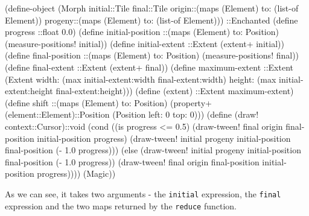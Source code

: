 \documentclass[acmsmall]{acmart}
\newenvironment{Snippet}{\Verbatim[samepage=true]}{\endVerbatim}
\begin{document}
\begin{Snippet}
(define-object (Morph initial::Tile final::Tile
		      origin::(maps (Element) to: (list-of Element))
		      progeny::(maps (Element) to: (list-of Element)))
  ::Enchanted
\end{Snippet}
\begin{Snippet}
  (define progress ::float 0.0)
\end{Snippet}
\begin{Snippet}
  (define initial-position ::(maps (Element) to: Position)
    (measure-positions! initial))
\end{Snippet}
\begin{Snippet}
  (define initial-extent ::Extent
    (extent+ initial))
\end{Snippet}
\begin{Snippet}
  (define final-position ::(maps (Element) to: Position)
    (measure-positions! final))
\end{Snippet}
\begin{Snippet}
  (define final-extent ::Extent
    (extent+ final))
\end{Snippet}
\begin{Snippet}
  (define maximum-extent ::Extent
    (Extent width: (max initial-extent:width final-extent:width)
	    height: (max initial-extent:height final-extent:height)))
\end{Snippet}
\begin{Snippet}
  (define (extent) ::Extent maximum-extent)
\end{Snippet}
\begin{Snippet}
  (define shift ::(maps (Element) to: Position)
    (property+ (element::Element)::Position
	       (Position left: 0 top: 0)))
\end{Snippet}
\begin{Snippet}
  (define (draw! context::Cursor)::void
    (cond ((is progress <= 0.5) 
 	   (draw-tween! final origin final-position initial-position progress)
           (draw-tween! initial progeny initial-position final-position 
                        (- 1.0 progress)))
	  (else
           (draw-tween! initial progeny initial-position final-position 
                        (- 1.0 progress))
           (draw-tween! final origin final-position initial-position progress))))
  (Magic))
\end{Snippet}

As we can see, it takes two arguments - the \texttt{initial} expression, the
\texttt{final} expression and the two maps returned by the \texttt{reduce} function.
\end{document}
